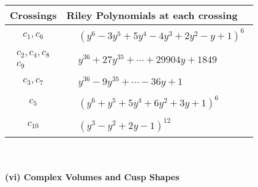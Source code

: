 \documentclass[1p]{elsarticle_modified}
\theoremstyle{definition}
\begin{document}
\begin{tabular}{m{50pt}|m{274pt}}
Crossings & \hspace{64pt}Riley Polynomials at each crossing \\
\hline $$\begin{aligned}c_{1},c_{6}\end{aligned}$$&$\begin{aligned}
&(y^6-3 y^5+5 y^4-4 y^3+2 y^2- y+1)^6
\end{aligned}$\\
\hline $$\begin{aligned}c_{2},c_{4},c_{8}\\c_{9}\end{aligned}$$&$\begin{aligned}
&y^{36}+27 y^{35}+\cdots+29904 y+1849
\end{aligned}$\\
\hline $$\begin{aligned}c_{3},c_{7}\end{aligned}$$&$\begin{aligned}
&y^{36}-9 y^{35}+\cdots-36 y+1
\end{aligned}$\\
\hline $$\begin{aligned}c_{5}\end{aligned}$$&$\begin{aligned}
&(y^6+y^5+5 y^4+6 y^2+3 y+1)^6
\end{aligned}$\\
\hline $$\begin{aligned}c_{10}\end{aligned}$$&$\begin{aligned}
&(y^3- y^2+2 y-1)^{12}
\end{aligned}$\\
\hline
\end{tabular}\\~\\
\newpage\flushleft \textbf{(vi) Complex Volumes and Cusp Shapes}
\end{document}
